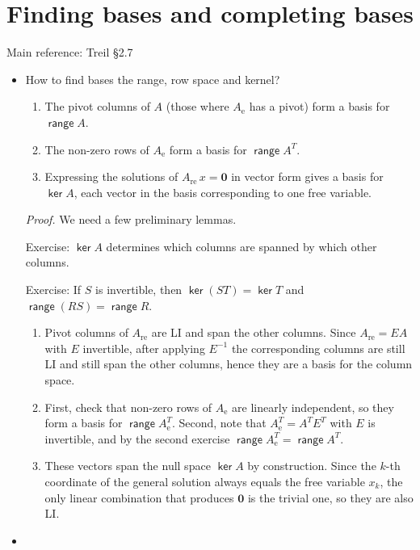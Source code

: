 \documentclass[11pt]{article}
\newcommand{\1}{\mathbf{1}}
\newcommand{\e}{{\mathrm{e}}}
\newcommand{\re}{{\mathrm{re}}}
\newcommand{\0}{\mathbf{0}}
\DeclareMathOperator{\myrange}{\mathsf{range}}
\DeclareMathOperator{\myker}{\mathsf{ker}}
\newcommand{\spitem}{\item[$\circ$]}
\begin{document}
\clearpage
\section{Finding bases and completing bases}

Main reference:
Treil
\S2.7

\begin{itemize}

\item

How to find bases the range, row space and kernel?
\begin{enumerate}
\item
The pivot columns of $A$ (those where $A_\e$ has a pivot) form a basis for $\myrange A$.
\item
The non-zero rows of $A_\e$ form a basis for $\myrange A^T$.
\item
Expressing the solutions of $A_\re \, x = \0$ in vector form gives a basis for $\myker A$, each vector in the basis corresponding to one free variable.
\end{enumerate}


\emph{Proof.} We need a few preliminary lemmas.

Exercise: $\myker A$ determines which columns are spanned by which other columns.

Exercise: If $S$ is invertible, then $\myker (ST) = \myker T$ and $\myrange (RS) = \myrange R$.

\begin{enumerate}
\item
Pivot columns of $A_\re$ are LI and span the other columns.
Since $A_\re = EA$ with $E$ invertible, after applying $E^{-1}$ the corresponding columns are still LI and still span the other columns,
hence they are a basis for the column space.
\item
First, check that non-zero rows of $A_\e$ are linearly independent, so they form a basis for $\myrange A_\e^T$.
Second, note that $A_\e^T = A^T E^T$ with $E$ is invertible, and by the second exercise $\myrange A_\e^T = \myrange A^T$.
\item
These vectors span the null space $\myker A$ by construction.
Since the $k$-th coordinate of the general solution always equals the free variable $x_k$, the only linear combination that produces $\0$ is the trivial one, so they are also LI.
\end{enumerate}

\spitem


\end{itemize}
\end{document}

